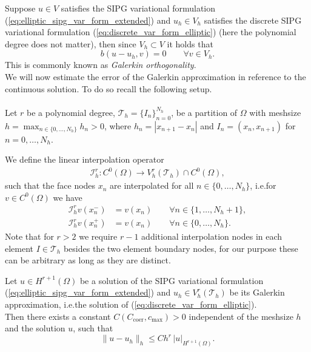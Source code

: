 Suppose $u \in V$ satisfies the SIPG variational formulation (\ref{eq:elliptic_sipg_var_form_extended}) and 
$u_h \in V_h$ satisfies the discrete SIPG variational formulation (\ref{eq:discrete_var_form_elliptic}) (here the polynomial degree does not matter),  
then since $V_h \subset V$ it holds that 
\begin{equation}
	\label{eq:galerkin_orthogonality}
	b(u - u_h, v) = 0 \qquad \forall v \in V_h.
\end{equation}
This is commonly known as \textit{Galerkin orthogonality}. \\
We will now estimate the error of the Galerkin approximation in reference to the continuous solution. To do so recall the following setup. \\ \\
Let $r$ be a polynomial degree, $\mathcal{T}_h = \{I_n\}_{n=0}^{N_h}$, be a partition of $\Omega$ with meshsize 
$h = \max_{n \in \{0,\ldots,N_h\}} h_n > 0$, where $h_n = |x_{n+1} - x_n |$ and $I_n = (x_{n}, x_{n+1})$ for 
$n=0,\ldots,N_h$.
\begin{definition}
	We define the linear interpolation operator 
	\begin{eqnarray*}
		\mathcal{I}_h^r : C^{0}(\Omega) \to V_h^r(\mathcal{T}_h) \cap C^0(\Omega),
	\end{eqnarray*}
	such that the face nodes $x_n$ are interpolated for all $n \in \{0,\ldots,N_h\}$, i.e.\@ for $v \in C^0(\Omega)$ we have
	\begin{align*}
		\mathcal{I}_h^r v (x_n^-) &= v(x_n) \qquad \forall n \in \{1,\ldots,N_h +1 \}, \\
		\mathcal{I}_h^r v (x_n^+) &= v(x_n) \qquad \forall n \in \{0,\ldots,N_h \}.
	\end{align*}
	Note that for $r > 2$ we require $r-1$ additional interpolation nodes in each element $I \in \mathcal{T}_h$ besides the two element boundary nodes, for our purpose these 
	can be arbitrary as long as they are distinct. 
\end{definition}
\begin{theorem}
	Let $u \in H^{r+1}(\Omega)$ be a solution of the SIPG variational formulation (\ref{eq:elliptic_sipg_var_form_extended}) and $u_h \in V_h^r(\mathcal{T}_h)$ be its
	Galerkin approximation, i.e.\@ the solution of (\ref{eq:discrete_var_form_elliptic}). \\
	Then there exists a constant $C(C_{\text{coer}}, c_{\max}) > 0$ independent of the meshsize $h$ and the solution $u$, such that 
	\begin{equation}
		\label{eq:elliptic_energy_convergence_rate}
		\|u - u_h \|_{h} \leq C h^{r} \, |u|_{H^{r+1}(\Omega)}.
	\end{equation}
	
\end{theorem}
